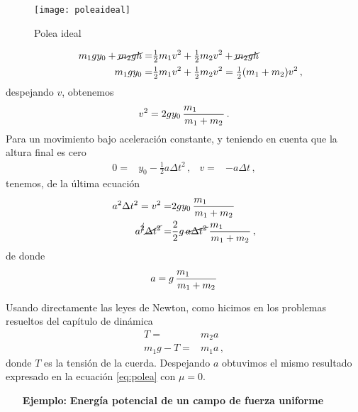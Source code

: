 \begin{frame}
  \begin{figure}
    \centering
    \texttt{[image: poleaideal]}
    \caption{Polea ideal}
    \label{fig:poleaideale}
  \end{figure}
\end{frame}

\begin{frame}
\begin{align*}
  m_1gy_0+\cancel{m_2gh}=&\tfrac{1}{2}m_1 v^2+\tfrac{1}{2}m_2 v^2+\cancel{m_2gh}\phantom{\color{red}+Q}\nonumber\\
 \phantom{\color{red}-\mu m_2 g y_0+}m_1gy_0=&\tfrac{1}{2}m_1 v^2+\tfrac{1}{2}m_2 v^2
  =\tfrac{1}{2}(m_1+m_2) v^2\,,
\end{align*}
despejando $v$, obtenemos
\begin{align*}
  v^2=2gy_0\,\frac{m_1\phantom{\color{red}-\mu m_2}}{m_1+m_2}\,.
\end{align*}
Para un movimiento bajo aceleración constante, y teniendo en cuenta que la altura final es cero
\begin{align*}
  0=&y_0-\tfrac{1}{2}a\Delta t^2\,,&
  v=&-a\Delta t\,,
\end{align*}
tenemos, de la última ecuación
\begin{align*}
  a^2 \Delta t^2=v^2
  =&2gy_0\,\frac{m_1\phantom{\color{red}-\mu m_2}}{m_1+m_2}\nonumber\\
  a^{\cancel{2}} \cancel{\Delta t^2}=&\frac{2}{2}g\,\cancel{a\Delta t^2}\,\frac{m_1\phantom{\color{red}-\mu m_2}}{m_1+m_2}\,,
\end{align*}
de donde
\begin{align}
\label{eq:acelfin}
  a=g\,\frac{m_1\phantom{\color{red}-\mu m_2}}{m_1+m_2}
\end{align}

\end{frame}
Usando directamente las leyes de Newton, como hicimos en los problemas resueltos del capítulo de dinámica
\begin{align}
  T=&m_2 a\nonumber\\
m_1g-T=&m_1 a\,,
\end{align}
donde $T$ es la tensión de la cuerda. Despejando $a$ obtuvimos el mismo resultado expresado en la ecuación \eqref{eq:polea} con $\mu=0$.



\begin{inprogress}
  \begin{itemize}
  \item[\textbf{Ejemplo:}] \textbf{Energía potencial de un campo de fuerza uniforme}
  \end{itemize}
\end{inprogress}

